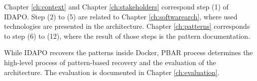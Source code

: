 Chapter \ref{ch:context} and Chapter \ref{ch:stakeholders} correspond step (1)
of IDAPO. Step (2) to (5) are related to Chapter \ref{ch:softwarearch}, where
used technologies are presented in the architecture. Chapter \ref{ch:patterns}
corresponds to step (6) to (12), where the result of those steps is the pattern
documentation.

While IDAPO recovers the patterns inside Docker, PBAR process determines the
high-level process of pattern-based recovery and the evaluation of the
architecture. The evaluation is documented in Chapter \ref{ch:evaluation}.

